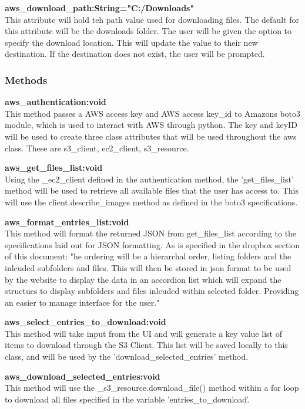 \textbf{aws\_download\_path:String="C:/Downloads"} \\
    This attribute will hold teh path value used for downloading files. The default for this attribute will be the downloads folder. The user 
    will be given the option to specify the download location. This will update the value to their new destination. If the destination does 
    not exist, the user will be prompted.

\subsubsection{Methods}
\textbf{aws\_authentication:void} \\
    This method passes a AWS access key and AWS access key_id to Amazons boto3 module, which is used to interact with AWS through python. The key 
    and keyID will be used to create three class attributes that will be used throughout the aws class. These are s3_client, ec2_client, s3_resource.
    
\textbf{aws\_get\_files\_list:void} \\
    Using the \_ec2\_client defined in the authentication method, the 'get\_files\_list' method will be used to retrieve all available files that the user 
    has access to. This will use the client.describe\_images method as defined in the boto3 specifications.

\textbf{aws\_format\_entries\_list:void} \\
    This method will format the returned JSON from get\_files\_list according to the specifications laid out for JSON formatting. As is specified in the
    dropbox section of this document: "he ordering will be a hierarchal order, listing folders and the inlcuded subfolders and files. This will then be stored in json format to be used by the website to display the data in an
    accordion list which will expand the structues to display subfolders and files inlcuded within selected folder. Providing an easier to manage
    interface for the user."

\textbf{aws\_select\_entries\_to\_download:void} \\
    This method will take input from the UI and will generate a key value list of items to download through the S3 Client. This list will be saved locally to this class,
    and will be used by the 'download\_selected\_entries' method.

\textbf{aws\_download\_selected\_entries:void} \\
    This method will use the _s3_resource.download_file() method within a for loop to download all files specified in the variable 'entries\_to\_download\'.

